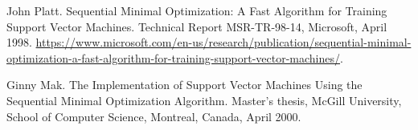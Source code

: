 \documentclass[10pt,a4paper]{article}
\begin{document}
 
\begin{thebibliography}{1}
	
	John Platt.
	\newblock Sequential Minimal Optimization: A Fast Algorithm for Training Support Vector Machines.
	\newblock Technical Report MSR-TR-98-14, Microsoft, April 1998.
	\newblock \url{https://www.microsoft.com/en-us/research/publication/sequential-minimal-optimization-a-fast-algorithm-for-training-support-vector-machines/}.
	
	Ginny Mak.
	\newblock The Implementation of Support Vector Machines Using the Sequential Minimal Optimization Algorithm.
	\newblock Master's thesis, McGill University, School of Computer Science, Montreal, Canada, April 2000.
	
\end{thebibliography}
\end{document}
